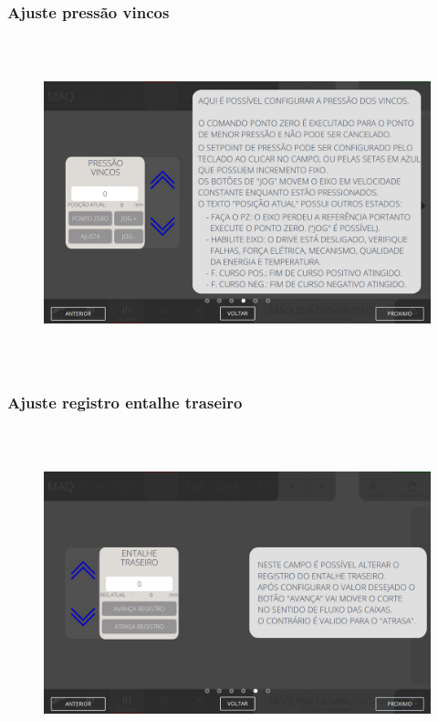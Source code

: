 \newpage
\thispagestyle{fancy}
\vspace*{40 pt}
\subsubsection{\small{Ajuste pressão vincos}}
\vspace*{\fill}
\begin{figure}[h]
  \centering
  \includegraphics[width=576px,height=360px]{src/imagesFlexo/05-slotter/settings/e-4.png}
\end{figure}
\vspace*{\fill}

\newpage
\thispagestyle{fancy}
\vspace*{40 pt}
\subsubsection{\small{Ajuste registro entalhe traseiro}}
\vspace*{\fill}
\begin{figure}[h]
  \centering
  \includegraphics[width=576px,height=360px]{src/imagesFlexo/05-slotter/settings/e-5.png}
\end{figure}
\vspace*{\fill}

